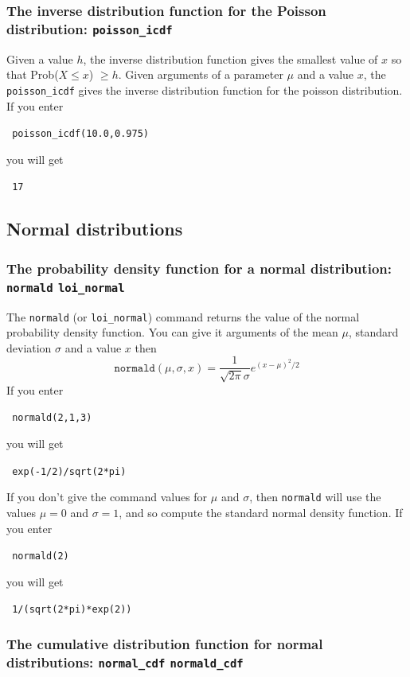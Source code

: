 \documentclass[a4paper,11pt]{book}
\begin{document}
\subsubsection{The inverse distribution function for the Poisson
distribution: \texttt{poisson\_icdf}}
Given a value $h$, the inverse distribution function gives
the smallest value
of $x$ so that Prob($X \le x$) $\ge h$.
Given arguments of a parameter $\mu$ and a value $x$, the
\texttt{poisson\_icdf} gives the inverse
distribution function for the poisson distribution.  If you enter
\begin{center}
  \tt
  poisson\_icdf(10.0,0.975)
\end{center}
you will get
\begin{center}
  \tt
  17
\end{center}

\subsection{Normal distributions}
\subsubsection{The probability density function for a normal
distribution: \texttt{normald} \texttt{loi\_normal}}

The \texttt{normald} (or \texttt{loi\_normal}) command returns the
value of the normal probability density function.  You can give it
arguments of the mean $\mu$, standard deviation $\sigma$ and a value
$x$ then 
\[
\texttt{normald}(\mu,\sigma,x) = \frac{1}{\sqrt{2\pi} \sigma}
e^{(x-\mu)^2/2}
\]
If you enter
\begin{center}
  \tt
  normald(2,1,3)
\end{center}
you will get
\begin{center}
  \tt
  exp(-1/2)/sqrt(2*pi)
\end{center}

If you don't give the command values for $\mu$ and $\sigma$, then
\texttt{normald} will use the values $\mu=0$ and $\sigma = 1$, and so
compute the standard normal density function.  If you enter
\begin{center}
  \tt
  normald(2)
\end{center}
you will get
\begin{center}
  \tt
  1/(sqrt(2*pi)*exp(2))
\end{center}

\subsubsection{The cumulative distribution function for normal
distributions: \texttt{normal\_cdf} \texttt{normald\_cdf}}
\end{document}
